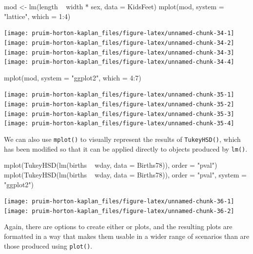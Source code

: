 \begin{Schunk}
\begin{Sinput}
mod <- lm(length ~ width * sex, data = KidsFeet)
mplot(mod, system = "lattice", which = 1:4)
\end{Sinput}


\begin{center}\texttt{[image: pruim-horton-kaplan\_files/figure-latex/unnamed-chunk-34-1]} \texttt{[image: pruim-horton-kaplan\_files/figure-latex/unnamed-chunk-34-2]} \texttt{[image: pruim-horton-kaplan\_files/figure-latex/unnamed-chunk-34-3]} \texttt{[image: pruim-horton-kaplan\_files/figure-latex/unnamed-chunk-34-4]} \end{center}

\end{Schunk}\begin{Schunk}
\begin{Sinput}
mplot(mod, system = "ggplot2", which = 4:7)
\end{Sinput}


\begin{center}\texttt{[image: pruim-horton-kaplan\_files/figure-latex/unnamed-chunk-35-1]} \texttt{[image: pruim-horton-kaplan\_files/figure-latex/unnamed-chunk-35-2]} \texttt{[image: pruim-horton-kaplan\_files/figure-latex/unnamed-chunk-35-3]} \texttt{[image: pruim-horton-kaplan\_files/figure-latex/unnamed-chunk-35-4]} \end{center}

\end{Schunk}

We can also use \texttt{mplot()} to visually represent the results of
\texttt{TukeyHSD()}, which has been modified so that it can be applied
directly to objects produced by \texttt{lm()}.

\begin{Schunk}
\begin{Sinput}
mplot(TukeyHSD(lm(births ~ wday, data = Births78)), order = "pval")
mplot(TukeyHSD(lm(births ~ wday, data = Births78)), order = "pval", system = "ggplot2") 
\end{Sinput}


\begin{center}\texttt{[image: pruim-horton-kaplan\_files/figure-latex/unnamed-chunk-36-1]} \texttt{[image: pruim-horton-kaplan\_files/figure-latex/unnamed-chunk-36-2]} \end{center}

\end{Schunk}

\noindent
Again, there are options to create either  or 
plots, and the resulting plots are formatted in a way that makes them
usable in a wider range of scenarios than are those produced using
\texttt{plot()}.

